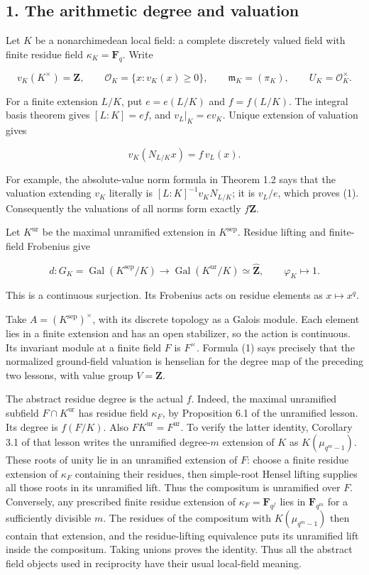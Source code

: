 \documentclass[11pt,a4paper]{article}
\begin{document}
\subsection{1. The arithmetic degree and
valuation}\label{the-arithmetic-degree-and-valuation}

Let \(K\) be a nonarchimedean local field: a complete discretely valued
field with finite residue field \(\kappa_K=\mathbf F_q\). Write

\[
v_K(K^\times)=\mathbf Z,\qquad
\mathcal O_K=\{x:v_K(x)\geq0\},\qquad
\mathfrak m_K=(\pi_K),\qquad U_K=\mathcal O_K^\times.
\]

For a finite extension \(L/K\), put \(e=e(L/K)\) and \(f=f(L/K)\). The
integral basis theorem gives \([L:K]=ef\), and \(v_L|_K=e v_K\). Unique
extension of valuation gives

\[
v_K(N_{L/K}x)=f\,v_L(x).
\tag{1}
\]

For example, the absolute-value norm formula in Theorem 1.2 says that
the valuation extending \(v_K\) literally is \([L:K]^{-1}v_KN_{L/K}\);
it is \(v_L/e\), which proves (1). Consequently the valuations of all
norms form exactly \(f\mathbf Z\).

Let \(K^{\mathrm{ur}}\) be the maximal unramified extension in
\(K^{\mathrm{sep}}\). Residue lifting and finite-field Frobenius give

\[
d:G_K=\operatorname{Gal}(K^{\mathrm{sep}}/K)
\longrightarrow\operatorname{Gal}(K^{\mathrm{ur}}/K)
\simeq\widehat{\mathbf Z},
\qquad \varphi_K\longmapsto1.
\tag{2}
\]

This is a continuous surjection. Its Frobenius acts on residue elements
as \(x\mapsto x^q\).

Take \(A=(K^{\mathrm{sep}})^\times\), with its discrete topology as a
Galois module. Each element lies in a finite extension and has an open
stabilizer, so the action is continuous. Its invariant module at a
finite field \(F\) is \(F^\times\). Formula (1) says precisely that the
normalized ground-field valuation is henselian for the degree map of the
preceding two lessons, with value group \(V=\mathbf Z\).

The abstract residue degree is the actual \(f\). Indeed, the maximal
unramified subfield \(F\cap K^{\mathrm{ur}}\) has residue field
\(\kappa_F\), by Proposition 6.1 of the unramified lesson. Its degree is
\(f(F/K)\). Also \(FK^{\mathrm{ur}}=F^{\mathrm{ur}}\). To verify the
latter identity, Corollary 3.1 of that lesson writes the unramified
degree-\(m\) extension of \(K\) as \(K(\mu_{q^m-1})\). These roots of
unity lie in an unramified extension of \(F\): choose a finite residue
extension of \(\kappa_F\) containing their residues, then simple-root
Hensel lifting supplies all those roots in its unramified lift. Thus the
compositum is unramified over \(F\). Conversely, any prescribed finite
residue extension of \(\kappa_F=\mathbf F_{q^f}\) lies in
\(\mathbf F_{q^m}\) for a sufficiently divisible \(m\). The residues of
the compositum with \(K(\mu_{q^m-1})\) then contain that extension, and
the residue-lifting equivalence puts its unramified lift inside the
compositum. Taking unions proves the identity. Thus all the abstract
field objects used in reciprocity have their usual local-field meaning.
\end{document}
